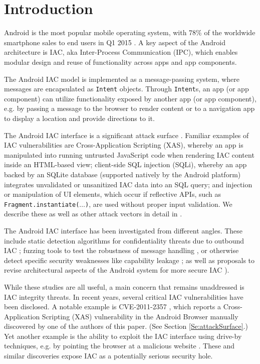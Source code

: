 \section{Introduction}\label{Se:introduction}

Android is the most popular mobile operating system, with 78\% of the worldwide smartphone sales to end users in Q1 2015 \cite{idc-android-share}. A key aspect of the Android architecture is IAC, aka Inter-Process Communication (IPC), which enables modular design and reuse of functionality across apps and app components.

The Android IAC model is implemented as a message-passing system, where messages are encapsulated as {\tt Intent} objects. Through {\tt Intent}s, an app (or app component) can utilize functionality exposed by another app (or app component), e.g. by passing a message to the browser to render content or to a navigation app to display a location and provide directions to it. 

The Android IAC interface is a significant attack surface \cite{CPGW:MOBISYS11,MAB:DSN12,EOM:SP09}. Familiar examples of IAC vulnerabilities are Cross-Application Scripting (XAS), whereby an app is manipulated into running untrusted JavaScript code when rendering IAC content inside an HTML-based view; client-side SQL injection (SQLi), whereby an app backed by an SQLite database (supported natively by the Android platform) integrates unvalidated or unsanitized IAC data into an SQL query; and injection or manipulation of UI elements, which occur if reflective APIs, such as {\tt Fragment.instantiate($\ldots$)}, are used without proper input validation. We describe these as well as other attack vectors in detail in . 

 The Android IAC interface has been investigated from different angles. These include static detection algorithms for confidentiality threats due to outbound IAC \cite{EOM:SP09}; fuzzing tools to test the robustness of message handling \cite{MAB:DSN12}, or otherwise detect specific security weaknesses like capability leakage \cite{YZWZD:ACCS14}; as well as proposals to revise architectural aspects of the Android system for more secure IAC \cite{KCHW:SPSM12}).

While these studies are all useful, a main concern that remains unaddressed is IAC integrity threats. In recent years, several critical IAC vulnerabilities have been disclosed. A notable example is CVE-2011-2357 \cite{XAS-CVE}, which reports a Cross-Application Scripting (XAS) vulnerability
 in the Android Browser manually discovered by one of the authors of this paper. (See Section \ref{Se:attackSurface}.) Yet another example is the ability to exploit the IAC interface using drive-by techniques, e.g. by pointing the browser at a malicious website \cite{T:driveby}. These and similar discoveries expose IAC as a potentially serious security hole.

